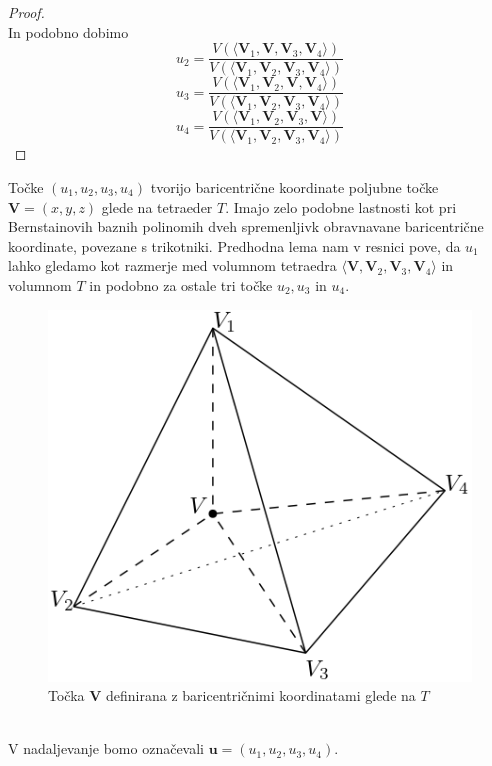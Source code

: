 \documentclass[a4paper, 12pt]{article}
\theoremstyle{definition} %
\theoremstyle{plain} %
\begin{document}
\begin{proof}
$$$$
In podobno dobimo
$$
u_{2} = \frac{V(\langle\textbf{V}_{1}, \textbf{V}, \textbf{V}_{3}, \textbf{V}_{4}\rangle)}{V(\langle\textbf{V}_{1}, \textbf{V}_{2}, \textbf{V}_{3}, \textbf{V}_{4}\rangle)}
$$
\vspace{2mm}
$$
u_{3} = \frac{V(\langle\textbf{V}_{1}, \textbf{V}_{2}, \textbf{V}, \textbf{V}_{4}\rangle)}{V(\langle\textbf{V}_{1}, \textbf{V}_{2}, \textbf{V}_{3}, \textbf{V}_{4}\rangle)}
$$
\vspace{2mm}
$$
u_{4} = \frac{V(\langle\textbf{V}_{1}, \textbf{V}_{2}, \textbf{V}_{3}, \textbf{V}\rangle)}{V(\langle\textbf{V}_{1}, \textbf{V}_{2}, \textbf{V}_{3}, \textbf{V}_{4}\rangle)}
$$
\end{proof}
Točke $(u_{1}, u_{2}, u_{3}, u_{4})$ tvorijo baricentrične koordinate poljubne točke $\textbf{V} = (x, y, z)$ glede na tetraeder $T$. Imajo zelo podobne lastnosti kot  
pri Bernstainovih baznih polinomih dveh spremenljivk obravnavane baricentrične koordinate, povezane s trikotniki. 
Predhodna lema nam v resnici pove, da $u_{1}$ lahko gledamo kot razmerje med volumnom tetraedra $\langle\textbf{V}, \textbf{V}_{2}, \textbf{V}_{3}, \textbf{V}_{4}\rangle$ in volumnom $T$ in podobno za ostale tri točke $u_{2}, u_{3}$ in $u_{4}$. 
\begin{figure}[h!]
\centering
  \includegraphics[scale=0.4]{tetraedar2}
  \caption{Točka \textbf{V} definirana z baricentričnimi koordinatami glede na $T$}
  \label{fig:tetraedar2}
\end{figure}
\\V nadaljevanje bomo označevali $\textbf{u} = (u_{1}, u_{2}, u_{3}, u_{4})$. 
\end{document}

